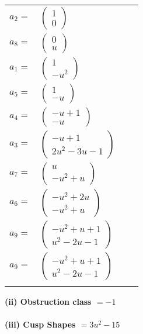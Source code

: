 \documentclass[1p]{elsarticle_modified}
\theoremstyle{definition}
\begin{document}
\begin{tabular}{m{7pt} m{180pt} m{7pt} m{180pt} }
\flushright $a_{2}=$&$\begin{pmatrix}1\\0\end{pmatrix}$ \\
\flushright $a_{8}=$&$\begin{pmatrix}0\\u\end{pmatrix}$ \\
\flushright $a_{1}=$&$\begin{pmatrix}1\\- u^2\end{pmatrix}$ \\
\flushright $a_{5}=$&$\begin{pmatrix}1\\- u\end{pmatrix}$ \\
\flushright $a_{4}=$&$\begin{pmatrix}- u+1\\- u\end{pmatrix}$ \\
\flushright $a_{3}=$&$\begin{pmatrix}- u+1\\2 u^2-3 u-1\end{pmatrix}$ \\
\flushright $a_{7}=$&$\begin{pmatrix}u\\- u^2+u\end{pmatrix}$ \\
\flushright $a_{6}=$&$\begin{pmatrix}- u^2+2 u\\- u^2+u\end{pmatrix}$ \\
\flushright $a_{9}=$&$\begin{pmatrix}- u^2+u+1\\u^2-2 u-1\end{pmatrix}$\\ \flushright $a_{9}=$&$\begin{pmatrix}- u^2+u+1\\u^2-2 u-1\end{pmatrix}$\\&\end{tabular}
\flushleft \textbf{(ii) Obstruction class $= -1$}\\~\\
\flushleft \textbf{(iii) Cusp Shapes $= 3 u^2-15$}\\~\\
\end{document}
